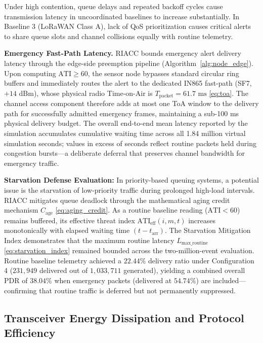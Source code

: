 \documentclass[preprint,review,12pt]{elsarticle}
\begin{document}
Under high contention, queue delays and repeated backoff cycles cause transmission latency in uncoordinated baselines to increase substantially. In Baseline 3 (LoRaWAN Class A), lack of QoS prioritization causes critical alerts to share queue slots and channel collisions equally with routine telemetry.

\textbf{Emergency Fast-Path Latency.} RIACC bounds emergency alert delivery latency through the edge-side preemption pipeline (Algorithm~\ref{alg:node_edge}). Upon computing $\text{ATI} \ge 60$, the sensor node bypasses standard circular ring buffers and immediately routes the alert to the dedicated IN865 fast-path (SF7, $+14\text{ dBm}$), whose physical radio Time-on-Air is $T_{\text{packet}} = 61.7\text{ ms}$ \eqref{eq:toa}. The channel access component therefore adds at most one ToA window to the delivery path for successfully admitted emergency frames, maintaining a sub-100 ms physical delivery budget. The overall end-to-end mean latency reported by the simulation accumulates cumulative waiting time across all 1.84 million virtual simulation seconds; values in excess of seconds reflect routine packets held during congestion bursts—a deliberate deferral that preserves channel bandwidth for emergency traffic.

\textbf{Starvation Defense Evaluation:} In priority-based queuing systems, a potential issue is the starvation of low-priority traffic during prolonged high-load intervals. RIACC mitigates queue deadlock through the mathematical aging credit mechanism $C_{\text{age}}$ \eqref{eq:aging_credit}. As a routine baseline reading ($\text{ATI} < 60$) remains buffered, its effective threat index $\text{ATI}_{\text{eff}}(i,m,t)$ increases monotonically with elapsed waiting time $(t - t_{\text{arr}})$. The Starvation Mitigation Index demonstrates that the maximum routine latency $L_{\text{max\_routine}}$ \eqref{eq:starvation_index} remained bounded across the two-million-event evaluation. Routine baseline telemetry achieved a $22.44\%$ delivery ratio under Configuration 4 ($231,949$ delivered out of $1,033,711$ generated), yielding a combined overall PDR of $38.04\%$ when emergency packets (delivered at $54.74\%$) are included—confirming that routine traffic is deferred but not permanently suppressed.

\subsection{Transceiver Energy Dissipation and Protocol Efficiency}
\label{sec:results_energy}
\end{document}
